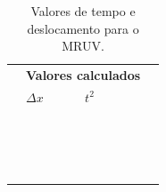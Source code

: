 \begin{table}[!ht]
\begin{tabular}{lp{25mm}p{25mm}p{25mm}l}
	\cmidrule{2-4}
\\
	& \multicolumn{3}{l}{\textbf{Valores calculados}} \\
	\cmidrule{2-3}
	& $\Delta x$ & $t^2$ \\
	\cmidrule{2-3}
	& \cellcolor[gray]{0.89} & \cellcolor[gray]{0.92} \\
	& \cellcolor[gray]{0.95} & \cellcolor[gray]{0.97} \\
	& \cellcolor[gray]{0.89} & \cellcolor[gray]{0.92} \\
	& \cellcolor[gray]{0.95} & \cellcolor[gray]{0.97} \\
	& \cellcolor[gray]{0.89} & \cellcolor[gray]{0.92} \\
	& \cellcolor[gray]{0.95} & \cellcolor[gray]{0.97} \\
	& \cellcolor[gray]{0.89} & \cellcolor[gray]{0.92} \\
	& \cellcolor[gray]{0.95} & \cellcolor[gray]{0.97} \\
	& \cellcolor[gray]{0.89} & \cellcolor[gray]{0.92} \\
	& \cellcolor[gray]{0.95} & \cellcolor[gray]{0.97} \\
	& \cellcolor[gray]{0.89} & \cellcolor[gray]{0.92} \\
	& \cellcolor[gray]{0.95} & \cellcolor[gray]{0.97} \\
	& \cellcolor[gray]{0.89} & \cellcolor[gray]{0.92} \\
	& \cellcolor[gray]{0.95} & \cellcolor[gray]{0.97} \\
	& \cellcolor[gray]{0.89} & \cellcolor[gray]{0.92} \\
	& \cellcolor[gray]{0.95} & \cellcolor[gray]{0.97} \\
	\cmidrule{2-3}
\bottomrule
\end{tabular}
\caption{Valores de tempo e deslocamento para o MRUV.}
\label{TabelaDadosLeisDeNewton}
\end{table}
